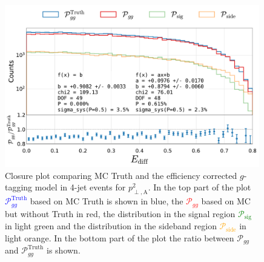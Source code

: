 \begin{figure}
  \centerfloat
  \includegraphics[width=0.99\textwidth, trim=10 0 20 5, clip, page=8]{figures/quarks/gtag-closure_test-down_sample=1.00-ML_vars=vertex-selection=b-ejet_min=4-n_iter_RS_lgb=99-n_iter_RS_xgb=9-cdot_cut=0.90-version=19-njet=4.pdf}
  \caption[Closure Plot Comparing MC Truth and the Efficiency Corrected $g$-Tagging Model in 4-Jet Events for $p^2_{\perp,\mathrm{A}}$]
          {Closure plot comparing MC Truth and the efficiency corrected $g$-tagging model in 4-jet events for $p^2_{\perp,\mathrm{A}}$. In the top part of the plot \textcolor{blue}{$\mathcal{P}_{gg}^\mathrm{Truth}$} based on MC Truth is shown in blue, the \textcolor{red}{$\mathcal{P}_{gg}$} based on MC but without Truth in red, the distribution in the signal region \textcolor{green}{$\mathcal{P}_{\mathrm{sig}}$} in light green and the distribution in the sideband region \textcolor{orange}{$\mathcal{P}_{\mathrm{side}}$} in light orange. In the bottom part of the plot the ratio between $\mathcal{P}_{gg}$ and $\mathcal{P}_{gg}^\mathrm{Truth}$  is shown. } 
  \label{fig:q:closure_variable_pt_antenna}
\end{figure}
\clearpage







\FloatBarrier
